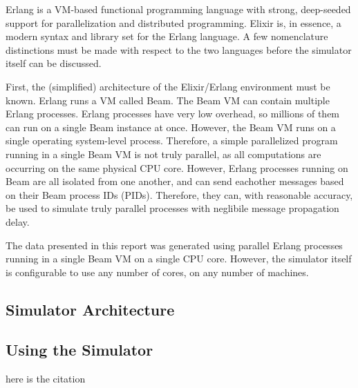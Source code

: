 \documentclass[12pt]{article}
\begin{document}
Erlang is a VM-based functional programming language with strong, deep-seeded support for parallelization and distributed programming. Elixir is, in essence, a modern syntax and library set for the Erlang language. A few nomenclature distinctions must be made with respect to the two languages before the simulator itself can be discussed.

First, the (simplified) architecture of the Elixir/Erlang environment must be known. Erlang runs a VM called Beam. The Beam VM can contain multiple Erlang processes. Erlang processes have very low overhead, so millions of them can run on a single Beam instance at once. However, the Beam VM runs on a single operating system-level process. Therefore, a simple parallelized program running in a single Beam VM is not truly parallel, as all computations are occurring on the same physical CPU core. However, Erlang processes running on Beam are all isolated from one another, and can send eachother messages based on their Beam process IDs (PIDs). Therefore, they can, with reasonable accuracy, be used to simulate truly parallel processes with neglibile message propagation delay.

The data presented in this report was generated using parallel Erlang processes running in a single Beam VM on a single CPU core. However, the simulator itself is configurable to use any number of cores, on any number of machines.

\subsection{Simulator Architecture}

\subsection{Using the Simulator}


\begin{thebibliography}{9} 

 here is the citation


\end{thebibliography} 
\end{document}
